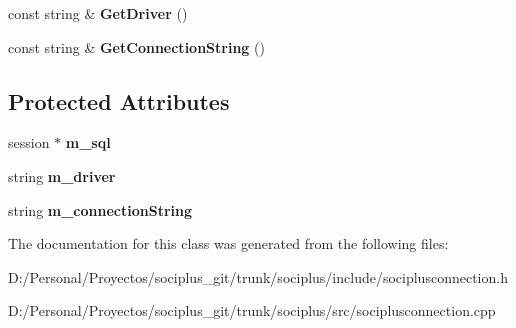 \begin{DoxyCompactItemize}
\item 
\hypertarget{class_soci_plus_1_1_soci_plus_connection_aa67b916a13243d0d98c96914ff15d91f}{const string \& {\bfseries Get\+Driver} ()}\label{class_soci_plus_1_1_soci_plus_connection_aa67b916a13243d0d98c96914ff15d91f}

\item 
\hypertarget{class_soci_plus_1_1_soci_plus_connection_ab6b4dfadd0f60b8d0d1c25b60cc52779}{const string \& {\bfseries Get\+Connection\+String} ()}\label{class_soci_plus_1_1_soci_plus_connection_ab6b4dfadd0f60b8d0d1c25b60cc52779}

\end{DoxyCompactItemize}
\subsection*{Protected Attributes}
\begin{DoxyCompactItemize}
\item 
\hypertarget{class_soci_plus_1_1_soci_plus_connection_ac7cc98a7a2a789ed882335e23d2b5758}{session $\ast$ {\bfseries m\+\_\+sql}}\label{class_soci_plus_1_1_soci_plus_connection_ac7cc98a7a2a789ed882335e23d2b5758}

\item 
\hypertarget{class_soci_plus_1_1_soci_plus_connection_a7b49011fd8c124f5a0827f33e09c003f}{string {\bfseries m\+\_\+driver}}\label{class_soci_plus_1_1_soci_plus_connection_a7b49011fd8c124f5a0827f33e09c003f}

\item 
\hypertarget{class_soci_plus_1_1_soci_plus_connection_acde14f932cc6cbe0a0302b5da31caa89}{string {\bfseries m\+\_\+connection\+String}}\label{class_soci_plus_1_1_soci_plus_connection_acde14f932cc6cbe0a0302b5da31caa89}

\end{DoxyCompactItemize}


The documentation for this class was generated from the following files\+:\begin{DoxyCompactItemize}
\item 
D\+:/\+Personal/\+Proyectos/sociplus\+\_\+git/trunk/sociplus/include/sociplusconnection.\+h\item 
D\+:/\+Personal/\+Proyectos/sociplus\+\_\+git/trunk/sociplus/src/sociplusconnection.\+cpp\end{DoxyCompactItemize}
